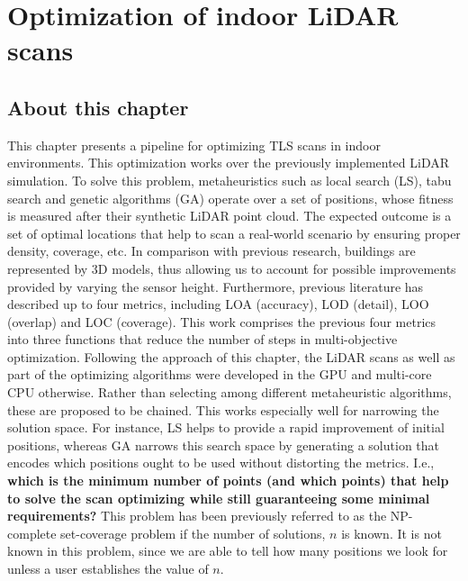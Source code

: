\setchapterpreamble[u]{\margintoc}
\chapter{Optimization of indoor LiDAR scans}
\label{sec:lidar_optimization}

\section*{About this chapter}

This chapter presents a pipeline for optimizing TLS scans in indoor environments. This optimization works over the previously implemented LiDAR simulation. To solve this problem, metaheuristics such as local search (LS), tabu search and genetic algorithms (GA) operate over a set of positions, whose fitness is measured after their synthetic LiDAR point cloud. The expected outcome is a set of optimal locations that help to scan a real-world scenario by ensuring proper density, coverage, etc. In comparison with previous research, buildings are represented by 3D models, thus allowing us to account for possible improvements provided by varying the sensor height. Furthermore, previous literature has described up to four metrics, including LOA (accuracy), LOD (detail), LOO (overlap) and LOC (coverage). This work comprises the previous four metrics into three functions that reduce the number of steps in multi-objective optimization. Following the approach of this chapter, the LiDAR scans as well as part of the optimizing algorithms were developed in the GPU and multi-core CPU otherwise. Rather than selecting among different metaheuristic algorithms, these are proposed to be chained. This works especially well for narrowing the solution space. For instance, LS helps to provide a rapid improvement of initial positions, whereas GA narrows this search space by generating a solution that encodes which positions ought to be used without distorting the metrics. I.e., \textbf{which is the minimum number of points (and which points) that help to solve the scan optimizing while still guaranteeing some minimal requirements?} This problem has been previously referred to as  the NP-complete set-coverage problem \cite{li_probability_2021, mohamadi_efficient_2021, roostapour_pareto_2022} if the number of solutions, $n$ is known. It is not known in this problem, since we are able to tell how many positions we look for unless a user establishes the value of $n$.

